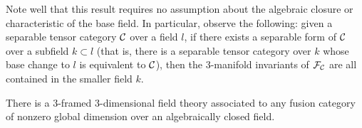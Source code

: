 \documentclass{amsart}
\begin{document}
\begin{remark}
Note well that this result requires no assumption about the algebraic closure or characteristic of the base field.  In particular, observe the following: given a separable tensor category $\mathcal C$ over a field $l$, if there exists a separable form of $\mathcal C$ over a subfield $k \subset l$ (that is, there is a separable tensor category %
over $k$ whose base change to $l$ is equivalent to $\mathcal C$), then the 3-manifold invariants of $\mathcal F_\mathcal C$ are all contained in the smaller field $k$.
\end{remark}

\begin{corollary} \label{cor:fusiontft}
There is a 3-framed 3-dimensional field theory associated to any fusion category of nonzero global dimension over an algebraically closed field.
\end{corollary}
\end{document}
